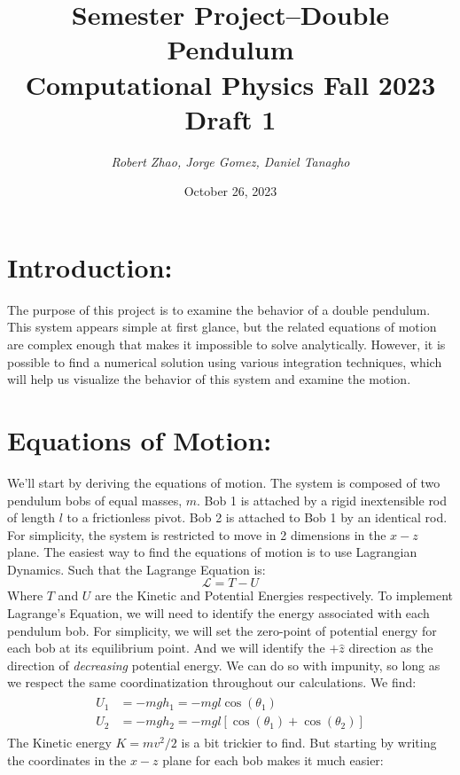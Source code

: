 \documentclass{article}
\title{Semester Project--Double Pendulum \\Computational Physics Fall 2023 \\Draft 1}
\author{\textit{Robert Zhao, Jorge Gomez, Daniel Tanagho}}
\date{October 26, 2023}
\begin{document}
\maketitle

\section*{Introduction:}
The purpose of this project is to examine the behavior of a double pendulum. This system appears simple at first glance, but the related equations of motion are complex enough that makes it impossible to solve analytically. However, it is possible to find a numerical solution using various integration techniques, which will help us visualize the behavior of this system and examine the motion.

\section{Equations of Motion:}
We'll start by deriving the equations of motion. The system is composed of two pendulum bobs of equal masses, $m$. Bob 1 is attached by a rigid inextensible rod of length $l$ to a frictionless pivot. Bob 2 is attached to Bob 1 by an identical rod. For simplicity, the system is restricted to move in 2 dimensions in the $x-z$ plane. The easiest way to find the equations of motion is to use Lagrangian Dynamics. Such that the Lagrange Equation is:
\begin{equation}
    \mathcal{L} = T - U
\end{equation}
Where $T$ and $U$ are the Kinetic and Potential Energies respectively. To implement Lagrange's Equation, we will need to identify the energy associated with each pendulum bob. For simplicity, we will set the zero-point of potential energy for each bob at its equilibrium point. And we will identify the $+\hat{z}$ direction as the direction of \textit{decreasing} potential energy. We can do so with impunity, so long as we respect the same coordinatization throughout our calculations. We find:
\begin{align*}
\begin{split}
    U_1 & = -mgh_1 = -mgl\cos(\theta_1) \\
    U_2 & = -mgh_2 = -mgl[\cos(\theta_1)+\cos(\theta_2)]
\end{split}
\end{align*}
The Kinetic energy $K = mv^2/2$ is a bit trickier to find. But starting by writing the coordinates in the $x-z$ plane for each bob makes it much easier:
\end{document}
